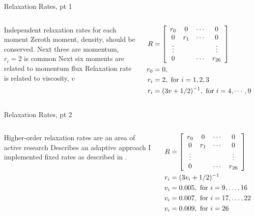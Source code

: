 \begin{frame}{Relaxation Rates, pt 1}
\begin{columns}
\begin{outline}
\1 Independent relaxation rates for each moment
\1 Zeroth moment, density, should be conserved.
\1 Next three are momentum, $r_i = 2$ is common
\1 Next six moments are related to momentum flux
\2 Relaxation rate is related to viscosity, $v$ 
\end{outline}
\begin{center}
\begin{align*}
  R &= \left[\begin{array}{c c c c}
  r_0 & 0 & \cdots & 0 \\
  0 & r_1 & \cdots & 0 \\
  \vdots & & & \vdots \\
  0 & & \cdots & r_{26} \\
  \end{array}\right] \\
  r_0 &= 0, \\
  r_i &= 2, \text{ for } i = 1, 2, 3 \\
  r_i &= (3v + 1/2)^{-1}, \text{ for } i = 4,\cdots,9
\end{align*}
\end{center}
\end{columns}
\end{frame}

\begin{frame}{Relaxation Rates, pt 2}
\begin{columns}
\begin{outline}
\1 Higher-order relaxation rates are an area of active research
\1 \cite{Li2020} Describes an adaptive approach
\1 I implemented fixed rates as described in \cite{Li2018}.
\end{outline}
\begin{center}
\begin{align*}
  R &= \left[\begin{array}{c c c c}
  r_0 & 0 & \cdots & 0 \\
  0 & r_1 & \cdots & 0 \\
  \vdots & & & \vdots \\
  0 & & \cdots & r_{26} \\
  \end{array}\right] \\
  r_i &= (3v_i + 1 / 2)^{-1}\\
  v_i &= 0.005, \text{ for } i = 9,\ldots, 16 \\
  v_i &= 0.007, \text{ for } i = 17, \ldots, 22 \\
  v_i &= 0.009, \text{ for } i = 26 
\end{align*}
\end{center}
\end{columns}
\end{frame}


